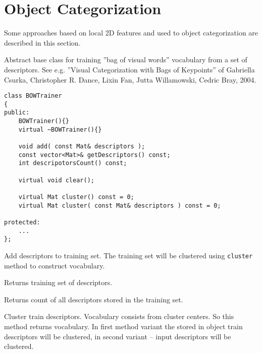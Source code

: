 \ifCpp
\section{Object Categorization}
Some approaches based on local 2D features and used to object categorization 
are described in this section.

Abstract base class for training ''bag of visual words'' vocabulary from a set of descriptors. 
See e.g. ''Visual Categorization with Bags of Keypoints'' of Gabriella Csurka, Christopher R. Dance, 
Lixin Fan, Jutta Willamowski, Cedric Bray, 2004.

\begin{lstlisting}
class BOWTrainer
{
public:
    BOWTrainer(){}
    virtual ~BOWTrainer(){}

    void add( const Mat& descriptors );
    const vector<Mat>& getDescriptors() const;
    int descripotorsCount() const;

    virtual void clear();

    virtual Mat cluster() const = 0;
    virtual Mat cluster( const Mat& descriptors ) const = 0;

protected:
    ...
};
\end{lstlisting}

Add descriptors to training set. The training set will be clustered using \texttt{cluster} 
method to construct vocabulary.


\begin{description}
\end{description}

Returns training set of descriptors.


Returns count of all descriptors stored in the training set.


Cluster train descriptors. Vocabulary consists from cluster centers. So this method 
returns vocabulary. In first method variant the stored in object train descriptors will be 
clustered, in second variant -- input descriptors will be clustered.

